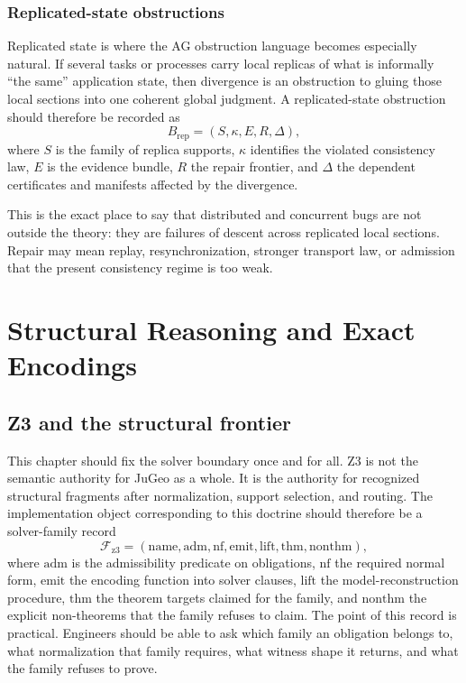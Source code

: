 \documentclass[11pt]{report}
\begin{document}
\section{Replicated-state obstructions}
Replicated state is where the AG obstruction language becomes especially natural. If several tasks or processes carry local replicas of what is informally ``the same'' application state, then divergence is an obstruction to gluing those local sections into one coherent global judgment. A replicated-state obstruction should therefore be recorded as
\[
B_{\mathrm{rep}} = (S,\kappa,E,R,\Delta),
\]
where $S$ is the family of replica supports, $\kappa$ identifies the violated consistency law, $E$ is the evidence bundle, $R$ the repair frontier, and $\Delta$ the dependent certificates and manifests affected by the divergence.

This is the exact place to say that distributed and concurrent bugs are not outside the theory: they are failures of descent across replicated local sections. Repair may mean replay, resynchronization, stronger transport law, or admission that the present consistency regime is too weak.
\part{Structural Reasoning and Exact Encodings}
\chapter{Z3 and the structural frontier}
This chapter should fix the solver boundary once and for all. Z3 is not the semantic authority for JuGeo as a whole. It is the authority for recognized structural fragments after normalization, support selection, and routing. The implementation object corresponding to this doctrine should therefore be a solver-family record
\[
\mathcal{F}_{\mathrm{z3}} = (\mathrm{name}, \mathrm{adm}, \mathrm{nf}, \mathrm{emit}, \mathrm{lift}, \mathrm{thm}, \mathrm{nonthm}),
\]
where $\mathrm{adm}$ is the admissibility predicate on obligations, $\mathrm{nf}$ the required normal form, $\mathrm{emit}$ the encoding function into solver clauses, $\mathrm{lift}$ the model-reconstruction procedure, $\mathrm{thm}$ the theorem targets claimed for the family, and $\mathrm{nonthm}$ the explicit non-theorems that the family refuses to claim. The point of this record is practical. Engineers should be able to ask which family an obligation belongs to, what normalization that family requires, what witness shape it returns, and what the family refuses to prove.
\end{document}
